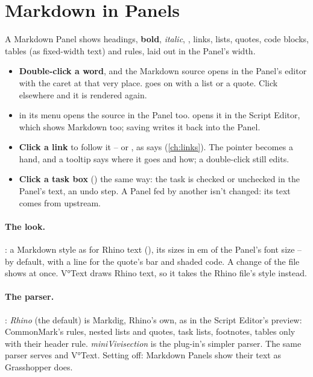 \section{Markdown in Panels}\label{sec:panelmarkdown}

A Markdown Panel shows headings, \textbf{bold}, \emph{italic}, , links, lists, quotes, code blocks, tables
(as fixed-width text) and rules, laid out in the Panel's width.


\begin{itemize}
  \item \textbf{Double-click a word}, and the Markdown source opens in the Panel's editor with the caret at that very place.
         goes on with a list or a quote. Click elsewhere and it is rendered again.
  \item {} in its menu opens the source in the Panel too.
         opens it in the Script Editor, which shows Markdown too; saving
        writes it back into the Panel.
  \item \textbf{Click a link} to follow it -- or , as  says
        (\cref{ch:links}). The pointer becomes a hand, and a tooltip says where it goes and how; a double-click still edits.
  \item \textbf{Click a task box} (\code{- [ ]}) the same way: the task is checked or unchecked in the Panel's text, an
        undo step. A Panel fed by another isn't changed: its text comes from upstream.
\end{itemize}

\paragraph{The look.} : a Markdown style as for Rhino text (),
its sizes in em of the Panel's font size --  by default, with a line
for the quote's bar and shaded code. A change of the file shows at once. V°Text draws Rhino text, so it takes the
Rhino file's style instead.

\paragraph{The parser.} : \emph{Rhino} (the default) is Markdig, Rhino's own, as in the Script
Editor's preview: CommonMark's rules, nested lists and quotes, task lists, footnotes, tables only with
their header rule. \emph{miniVivisection} is the plug-in's simpler parser. The same parser serves  and
V°Text. Setting  off: Markdown Panels show their text as Grasshopper does.

